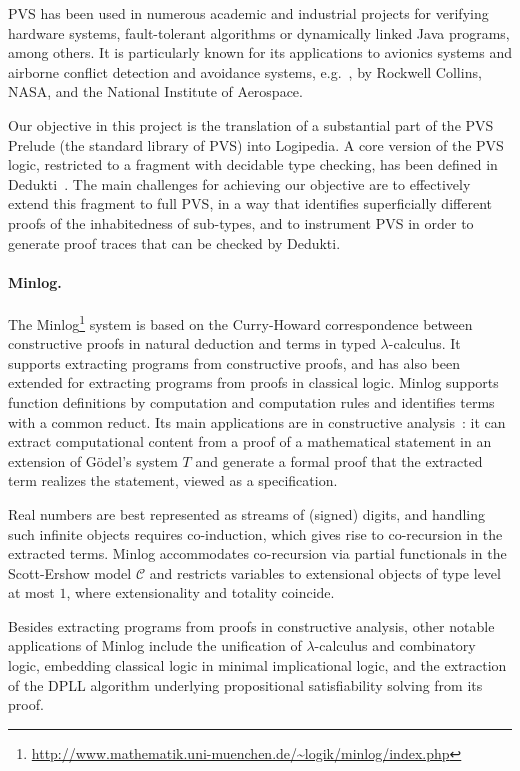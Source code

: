 PVS has been used in numerous academic and industrial projects for
verifying hardware systems, fault-tolerant algorithms or dynamically
linked Java programs, among others. It is particularly known for its
applications to avionics systems and airborne conflict detection and
avoidance systems, e.g.\ \cite{munoz:unmanned}, by Rockwell Collins,
NASA, and the National Institute of Aerospace.

Our objective in this project is the translation of a substantial part
of the PVS Prelude (the standard library of PVS) into Logipedia. A
core version of the PVS logic, restricted to a fragment with decidable
type checking, has been defined in
Dedukti~\cite{gilbert:extending}. The main challenges for achieving
our objective are to effectively extend this fragment to full PVS, in
a way that identifies superficially different proofs of the
inhabitedness of sub-types, and to instrument PVS in
order to generate proof traces that can be checked by Dedukti.

\paragraph*{Minlog.}
The
Minlog\footnote{\url{http://www.mathematik.uni-muenchen.de/~logik/minlog/index.php}}
system is based on the Curry-Howard correspondence between constructive proofs
in natural deduction and terms in typed $\lambda$-calculus. It supports
extracting programs from constructive proofs, and has also been extended for extracting
programs from proofs in classical logic. Minlog supports function definitions by
computation and computation rules and identifies terms with a common reduct. Its
main applications are in constructive analysis~\cite{miyamoto:real}: it can extract
computational content from a proof of a mathematical statement in an extension
of G\"odel's system $T$ and generate a formal proof that the extracted term
realizes the statement, viewed as a specification.

Real numbers are best represented as streams of (signed) digits, and handling
such infinite objects requires co-induction, which gives rise to co-recursion in
the extracted terms. Minlog accommodates co-recursion via partial functionals in
the Scott-Ershow model $\mathcal{C}$ and restricts variables to extensional
objects of type level at most $1$, where extensionality and totality coincide.

Besides extracting programs from proofs in constructive analysis, other notable
applications of Minlog include the unification of $\lambda$-calculus and
combinatory logic, embedding classical logic in minimal implicational logic, and
the extraction of the DPLL algorithm underlying propositional satisfiability
solving from its proof.

